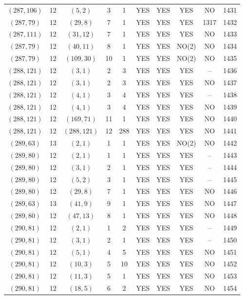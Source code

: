 \begin{longtable}{|c|c|c|c|c|c|c|c|c|c|}
$(287, 106)$ & 12 & $(5, 2)$ & 3 & 1 & YES & YES & YES & NO & 1431\\
$(287, 79)$ & 12 & $(29, 8)$ & 7 & 1 & YES & YES & YES & 1317 & 1432\\
$(287, 111)$ & 12 & $(31, 12)$ & 7 & 1 & YES & YES & YES & NO & 1433\\
$(287, 79)$ & 12 & $(40, 11)$ & 8 & 1 & YES & YES & NO(2) & NO & 1434\\
$(287, 79)$ & 12 & $(109, 30)$ & 10 & 1 & YES & YES & NO(2) & NO & 1435\\
$(288, 121)$ & 12 & $(3, 1)$ & 2 & 3 & YES & YES & YES & -- & 1436\\
$(288, 121)$ & 12 & $(3, 1)$ & 2 & 3 & YES & YES & YES & NO & 1437\\
$(288, 121)$ & 12 & $(4, 1)$ & 3 & 4 & YES & YES & YES & -- & 1438\\
$(288, 121)$ & 12 & $(4, 1)$ & 3 & 4 & YES & YES & YES & NO & 1439\\
$(288, 121)$ & 12 & $(169, 71)$ & 11 & 1 & YES & YES & YES & NO & 1440\\
$(288, 121)$ & 12 & $(288, 121)$ & 12 & 288 & YES & YES & YES & NO & 1441\\
$(289, 63)$ & 13 & $(2, 1)$ & 1 & 1 & YES & YES & NO(2) & NO & 1442\\
$(289, 80)$ & 12 & $(2, 1)$ & 1 & 1 & YES & YES & YES & -- & 1443\\
$(289, 80)$ & 12 & $(3, 1)$ & 2 & 1 & YES & YES & YES & -- & 1444\\
$(289, 80)$ & 12 & $(5, 2)$ & 3 & 1 & YES & YES & YES & -- & 1445\\
$(289, 80)$ & 12 & $(29, 8)$ & 7 & 1 & YES & YES & YES & NO & 1446\\
$(289, 63)$ & 13 & $(41, 9)$ & 9 & 1 & YES & YES & YES & NO & 1447\\
$(289, 80)$ & 12 & $(47, 13)$ & 8 & 1 & YES & YES & YES & NO & 1448\\
$(290, 81)$ & 12 & $(2, 1)$ & 1 & 2 & YES & YES & YES & -- & 1449\\
$(290, 81)$ & 12 & $(3, 1)$ & 2 & 1 & YES & YES & YES & -- & 1450\\
$(290, 81)$ & 12 & $(5, 1)$ & 4 & 5 & YES & YES & YES & NO & 1451\\
$(290, 81)$ & 12 & $(10, 3)$ & 5 & 10 & YES & YES & YES & NO & 1452\\
$(290, 81)$ & 12 & $(11, 3)$ & 5 & 1 & YES & YES & YES & NO & 1453\\
$(290, 81)$ & 12 & $(18, 5)$ & 6 & 2 & YES & YES & YES & NO & 1454\\

\end{longtable}

